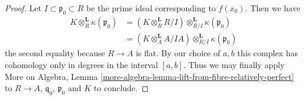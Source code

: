 \documentclass[10pt,a4paper]{amsart}
\theoremstyle{plain}
\theoremstyle{definition}
\theoremstyle{remark}
\numberwithin{equation}{subsection}
\begin{document}
\begin{proof}
\medskip\noindent
Let $I \subset \mathfrak p_0 \subset R$ be the prime
ideal corresponding to $f(x_0)$. Then we have
\begin{align*}
K \otimes_R^\mathbf{L} \kappa(\mathfrak p_0)
& =
(K \otimes_R^\mathbf{L} R/I) \otimes_{R/I}^\mathbf{L}
\kappa(\mathfrak p_0) \\
& =
(K \otimes_A^\mathbf{L} A/IA) \otimes_{R/I}^\mathbf{L} \kappa(\mathfrak p_0)
\end{align*}
the second equality because $R \to A$ is flat.
By our choice of $a, b$ this complex has cohomology
only in degrees in the interval $[a, b]$.
Thus we may finally apply
More on Algebra, Lemma
\ref{more-algebra-lemma-lift-from-fibre-relatively-perfect}
to $R \to A$, $\mathfrak q_0$, $\mathfrak p_0$ and $K$
to conclude.
\end{proof}
\end{document}
